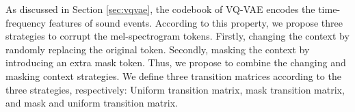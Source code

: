 \documentclass[lettersize,journal]{IEEEtran}
\begin{document}
As discussed in Section \ref{sec:vqvae}, the codebook of VQ-VAE encodes the time-frequency features of sound events. According to this property, we propose three strategies to corrupt the mel-spectrogram tokens. Firstly, changing the context by randomly replacing the original token. Secondly, masking the context by introducing an extra mask token. {} Thus, we propose to combine the changing and masking context strategies. We define three transition matrices according to the three strategies, respectively: Uniform transition matrix, mask transition matrix, and mask and uniform transition matrix.
\end{document}
